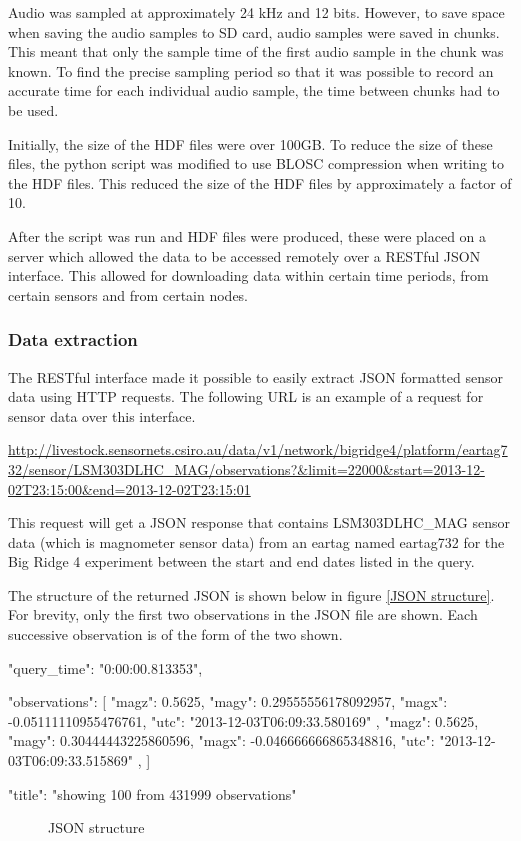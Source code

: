 Audio was sampled at approximately 24 kHz and 12 bits. However, to save space when saving the audio samples to SD card, audio samples were saved in chunks. This meant that only the sample time of the first audio sample in the chunk was known. To find the precise sampling period so that it was possible to record an accurate time for each individual audio sample, the time between chunks had to be used.  

Initially, the size of the HDF files were over 100GB. To reduce the size of these files, the python script was modified to use BLOSC compression when writing to the HDF files. This reduced the size of the HDF files by approximately a factor of 10.

After the script was run and HDF files were produced, these were placed on a server which allowed the data to be accessed remotely over a RESTful JSON interface. This allowed for downloading data within certain time periods, from certain sensors and from certain nodes. 

\subsubsection{Data extraction}

The RESTful interface made it possible to easily extract JSON formatted sensor data using HTTP requests. The following URL is an example of a request for sensor data over this interface. 

\url{http://livestock.sensornets.csiro.au/data/v1/network/bigridge4/platform/eartag732/sensor/LSM303DLHC\_MAG/observations?\&limit=22000\&start=2013-12-02T23:15:00\&end=2013-12-02T23:15:01} 

This request will get a JSON response that contains LSM303DLHC\_MAG sensor data (which is magnometer sensor data) from an eartag named eartag732 for the Big Ridge 4 experiment between the start and end dates listed in the query. 

The structure of the returned JSON is shown below in figure \ref{JSON structure}. For brevity, only the first two observations in the JSON file are shown. Each successive observation is of the form of the two shown. 

\begin{verbbox}
{
    "query_time": "0:00:00.813353",

    "observations": [
            {
                "magz": 0.5625,
                "magy": 0.29555556178092957,
                "magx": -0.05111110955476761,
                "utc": "2013-12-03T06:09:33.580169"
            },
            {
                "magz": 0.5625,
                "magy": 0.30444443225860596,
                "magx": -0.046666666865348816,
                "utc": "2013-12-03T06:09:33.515869"
            },
        ]

    "title": "showing 100 from 431999 observations"
}
\end{verbbox}
\begin{figure}[ht!]
  \centering
  \theverbbox
  \caption{JSON structure}
\end{figure}

